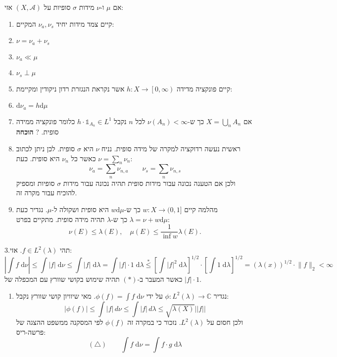 \documentclass{tstextbook}
\begin{document}
\begin{theorem}
אם \(\mu\) ו-\(\nu\) מידות \(\sigma\) סופיות על \(\left( X,\mathcal{A} \right)\) אזי:

  \begin{enumerate}
    \item קיים צמד מידות יחיד \(\nu_{a},\nu_{s}\) המקיים: 
    \item \(\nu=\nu_{a}+\nu_{s}\)
    \item \(\nu_{a}\ll \mu\)
    \item \(\nu_{s} \perp \mu\)


    \item קיים פונקציה מדידה \(h:X\to\left[ 0,\infty \right)\) אשר נקראת הנגזרת רדון ניקודין ומקיימת: 


    \item \(\mathrm{d}\nu_{a}=h\mathrm{d}\mu\)
    \item אם \(X=\bigcup_{n}A_{n}\) כך ש-\(\nu(A_{n})<\infty\) לכל \(n\) נקבל \(h\cdot \mathbb{1}_{A_{n}}\in L^{1}\) כלומר פונקציה ממידה סופית.
?
\textbf{הוכחה}


    \item ראשית נעשה רדוקציה למקרה של מידה סופית. נניח \(\nu\) היא \(\sigma\) סופית. לכן ניתן לכתוב \(\nu=\sum_{n}\nu_{n}\) כאשר כל \(\nu_{n}\) היא סופית. כעת: 
$$\nu_{a}=\sum_{n} \nu_{n,a}\qquad \nu_{s}=\sum_{n}\nu_{n,s}$$
ולכן אם הטענה נכונה עבור מידות סופית תהיה נכונה עבור מידות \(\sigma\) סופיות ומספיק להוכיח עבור מקרה זה.


    \item מהלמה קיים \(w:X\to (0,1]\) כך ש-\(w\mathrm{d}\mu\) היא סופית ושקולה ל-\(\mu\). נגדיר כעת \(\lambda=\nu+w\mathrm{d}\mu\) כך ש-\(\lambda\) תהיה מידה סופית. מתקיים בפרט: 
$$\nu(E)\leq\lambda(E),\quad\mu(E)\leq\frac{1}{\operatorname*{inf}w}\lambda(E).$$


  \end{enumerate}
3.תהי \(f \in L^{2}\left( \lambda \right)\). אזי: 
$$\left\lvert  \int f \;\mathrm{d} \nu   \right\rvert \leq \int \lvert f \rvert  \;\mathrm{d} \nu \leq \int \lvert f \rvert  \;\mathrm{d} \lambda =\int |f|\cdot 1 \;\mathrm{d} \lambda \overset{*}{\leq}  \left[ \int \lvert f \rvert ^{2} \;\mathrm{d} \lambda  \right]^{1/2}\cdot\left[ \int 1 \;\mathrm{d} \lambda  \right]^{1/2}=\left( \lambda(x) \right)^{1/2}\cdot \lVert f \rVert _{2} < \infty$$
כאשר המעבר ב-\((*)\) תהיה שימוש בקושי שוורץ עם המכפלה של \(|f|\cdot 1\). 

  \begin{enumerate}
    \item נגדיר \(\phi:L^{2}\left( \lambda \right)\to \mathbb{C}\) על ידי \(\phi(f)=\int f \;\mathrm{d} \nu\). מאי שיוויון קושי שוורץ נקבל: 
$$|\phi(f)|\leq\int|f|\,d\nu\leq\int|f|\,d\lambda\leq\sqrt{\lambda(X)}||f||$$
ולכן חסום על \(L^{2}\left( \lambda \right)\). נזכור כי במקרה זה \(\phi(f)\) לפי המסקנה ממשפט ההצגה של פרשה-ריס:
$$\left( \triangle \right) \qquad \int f \;\mathrm{d} \nu = \int f \cdot g \;\mathrm{d} \lambda $$



\end{enumerate}
\end{theorem}
\end{document}
